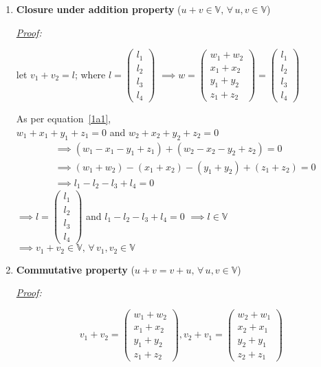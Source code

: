 \documentclass[12pt, letterpaper]{article}
\begin{document}
\begin{enumerate}

\item \textbf{Closure under addition property}
  ($u + v \in \mathbb{V}, \, \forall \, u, v \in \mathbb{V}$)

\textit{\underline{Proof}:}

  let $ v_1 + v_2 = l$; where $l = \begin{pmatrix}l_1\\l_2\\l_3\\l_4\end{pmatrix}$
  $
  \implies w = \begin{pmatrix}w_1 + w_2\\x_1 + x_2\\y_1 + y_2\\z_1 + z_2\end{pmatrix}
    = \begin{pmatrix}l_1\\l_2\\l_3\\l_4\end{pmatrix}
  $ 

  As per equation~\ref{1a1}, \\
  $w_1 + x_1 + y_1 + z_1 = 0$ and
  $w_2 + x_2 + y_2 + z_2 = 0$
  \[
  \begin{split}
  &\implies (w_1 - x_1 - y_1 + z_1) + (w_2 - x_2 - y_2 + z_2) = 0 \\
  &\implies (w_1 + w_2) - (x_1 + x_2) - (y_1 + y_2) + (z_1 + z_2) = 0\\
  &\implies l_1 - l_2 - l_3 + l_4 = 0
  \end{split}
  \]
  $\implies l = \begin{pmatrix}l_1\\l_2\\l_3\\l_4\end{pmatrix}$ and $l_1 - l_2 - l_3 + l_4 = 0$
  $\implies l \in \mathbb{V}$\\
  $\implies\boxed{v_1 + v_2 \in\mathbb{V}, \, \forall\, v_1,v_2 \in\mathbb{V}}$

\item \textbf{Commutative property}
  ($u + v = v + u, \, \forall \, u, v \in \mathbb{V}$)

\textit{\underline{Proof}:}

  \begin{equation}
  \label{1a2}
  v_1 + v_2 = \begin{pmatrix}w_1 + w_2\\x_1 + x_2\\y_1 + y_2\\z_1 + z_2\end{pmatrix},
  v_2 + v_1 = \begin{pmatrix}w_2 + w_1\\x_2 + x_1\\y_2 + y_1\\z_2 + z_1\end{pmatrix} 
  \end{equation}


\end{enumerate}
\end{document}
